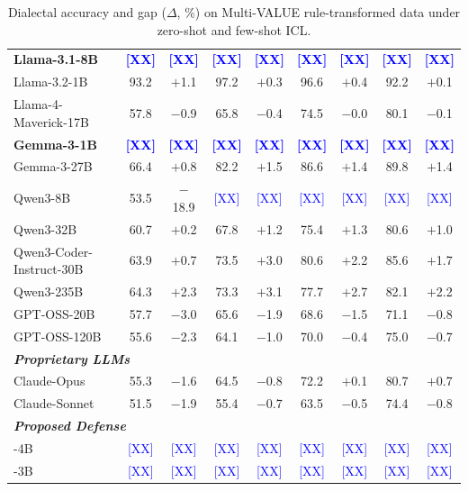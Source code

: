 \begin{table}[t]
\begin{tabular}{lcccccccc}
\textbf{Llama-3.1-8B} & \textcolor{blue}{\textbf{[XX]}} & \textcolor{blue}{\textbf{[XX]}} & \textcolor{blue}{\textbf{[XX]}} & \textcolor{blue}{\textbf{[XX]}} & \textcolor{blue}{\textbf{[XX]}} & \textcolor{blue}{\textbf{[XX]}} & \textcolor{blue}{\textbf{[XX]}} & \textcolor{blue}{\textbf{[XX]}} \\
Llama-3.2-1B & 93.2 & $+$1.1 & 97.2 & $+$0.3 & 96.6 & $+$0.4 & 92.2 & $+$0.1 \\
Llama-4-Maverick-17B & 57.8 & $-$0.9 & 65.8 & $-$0.4 & 74.5 & $-$0.0 & 80.1 & $-$0.1 \\
\textbf{Gemma-3-1B} & \textcolor{blue}{\textbf{[XX]}} & \textcolor{blue}{\textbf{[XX]}} & \textcolor{blue}{\textbf{[XX]}} & \textcolor{blue}{\textbf{[XX]}} & \textcolor{blue}{\textbf{[XX]}} & \textcolor{blue}{\textbf{[XX]}} & \textcolor{blue}{\textbf{[XX]}} & \textcolor{blue}{\textbf{[XX]}} \\
Gemma-3-27B & 66.4 & $+$0.8 & 82.2 & $+$1.5 & 86.6 & $+$1.4 & 89.8 & $+$1.4 \\
Qwen3-8B & 53.5 & $-$18.9 & \textcolor{blue}{[XX]} & \textcolor{blue}{[XX]} & \textcolor{blue}{[XX]} & \textcolor{blue}{[XX]} & \textcolor{blue}{[XX]} & \textcolor{blue}{[XX]} \\
Qwen3-32B & 60.7 & $+$0.2 & 67.8 & $+$1.2 & 75.4 & $+$1.3 & 80.6 & $+$1.0 \\
Qwen3-Coder-Instruct-30B & 63.9 & $+$0.7 & 73.5 & $+$3.0 & 80.6 & $+$2.2 & 85.6 & $+$1.7 \\
Qwen3-235B & 64.3 & $+$2.3 & 73.3 & $+$3.1 & 77.7 & $+$2.7 & 82.1 & $+$2.2 \\
GPT-OSS-20B & 57.7 & $-$3.0 & 65.6 & $-$1.9 & 68.6 & $-$1.5 & 71.1 & $-$0.8 \\
GPT-OSS-120B & 55.6 & $-$2.3 & 64.1 & $-$1.0 & 70.0 & $-$0.4 & 75.0 & $-$0.7 \\
\midrule[\lightrulewidth]
\multicolumn{9}{l}{\textbf{\textit{Proprietary LLMs}}} \\
Claude-Opus & 55.3 & $-$1.6 & 64.5 & $-$0.8 & 72.2 & $+$0.1 & 80.7 & $+$0.7 \\
Claude-Sonnet & 51.5 & $-$1.9 & 55.4 & $-$0.7 & 63.5 & $-$0.5 & 74.4 & $-$0.8 \\
\midrule
\multicolumn{9}{l}{\textbf{\textit{Proposed Defense}}} \\
\diaguard{}-4B & \textcolor{blue}{[XX]} & \textcolor{blue}{[XX]} & \textcolor{blue}{[XX]} & \textcolor{blue}{[XX]} & \textcolor{blue}{[XX]} & \textcolor{blue}{[XX]} & \textcolor{blue}{[XX]} & \textcolor{blue}{[XX]} \\
\diaguard{}-3B & \textcolor{blue}{[XX]} & \textcolor{blue}{[XX]} & \textcolor{blue}{[XX]} & \textcolor{blue}{[XX]} & \textcolor{blue}{[XX]} & \textcolor{blue}{[XX]} & \textcolor{blue}{[XX]} & \textcolor{blue}{[XX]} \\
\bottomrule
\end{tabular}
\caption{Dialectal accuracy and gap ($\Delta$, \%) on Multi-VALUE rule-transformed data under zero-shot and few-shot ICL.}
\label{tab:icl_results_mv}
\end{table}